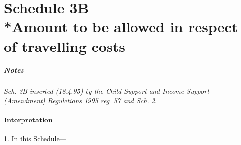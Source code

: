 \documentclass[a4paper]{article}
\newcommand{\parthead}{}
\newcommand\amendment[1]{\subsubsection*{Notes}{\itshape\frenchspacing\footnotesize #1 \par\goodbreak}}
\begin{document}
\part[Schedule 3B --- Amount to be allowed in respect of travelling costs]{Schedule 3B\\*Amount to be allowed in respect of travelling costs}

\renewcommand\parthead{--- Schedule 3B}

\amendment{
Sch. 3B inserted (18.4.95) by the Child Support and Income Support (Amendment) Regulations 1995 reg. 57 and Sch. 2.
}

\subsection*{Interpretation}

1.  In this Schedule—
\end{document}
